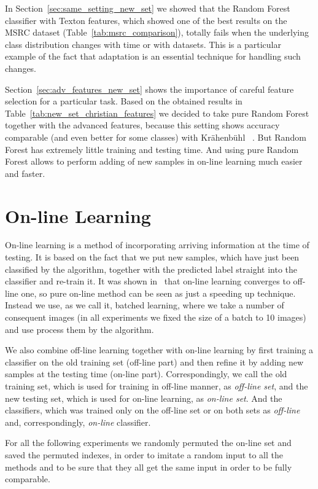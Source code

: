 In Section~\ref{sec:same_setting_new_set} we showed that the Random Forest classifier with Texton features, which showed one of the best results on the 
MSRC dataset (Table~\ref{tab:msrc_comparison}), totally fails when the underlying class distribution changes with time or with datasets. This is a 
particular example of the fact that adaptation is an essential technique for handling such changes.

Section~\ref{sec:adv_features_new_set} shows the importance of careful feature selection for a particular task. Based on the obtained results in
Table~\ref{tab:new_set_christian_features} we decided to take pure Random Forest together with the advanced features, because this setting shows
accuracy comparable (and even better for some classes) with Kr\"ahenb\"uhl \etal~\cite{Krahenbuhl2011}. But Random Forest has extremely little
training and testing time. And using pure Random Forest allows to perform adding of new samples in on-line learning much easier and faster.

\section{On-line Learning}
\label{sec:online_learning}

On-line learning is a method of incorporating arriving information at the time of testing. It is based on the fact that we put new samples, which 
have just been classified by the algorithm, together with the predicted label straight into the classifier and re-train it.
It was shown in~\cite{Saffari2009} that on-line learning converges to off-line one, so pure on-line method can be seen as just a speeding up technique.
Instead we use, as we call it, batched learning, where we take a number of consequent images (in all experiments we fixed the size of a batch to 10
images) and use process them by the algorithm.

We also combine off-line learning together with on-line learning by first training a classifier on the old training set (off-line part) and then refine it
by adding new samples at the testing time (on-line part). Correspondingly, we call the old training set, which is used for training in off-line manner,
as \emph{off-line set}, and the new testing set, which is used for on-line learning, as \emph{on-line set}. And the classifiers, which was trained only
on the off-line set or on both sets as \emph{off-line} and, correspondingly, \emph{on-line} classifier.

For all the following experiments we randomly permuted the on-line set and saved the permuted indexes, in order to imitate a random input to all the
methods and to be sure that they all get the same input in order to be fully comparable.

